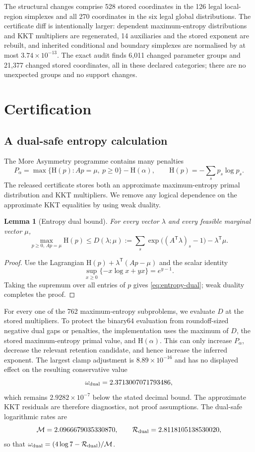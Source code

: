 \documentclass[11pt,reqno]{amsart}
\newtheorem{lemma}[theorem]{Lemma}
\theoremstyle{definition}
\theoremstyle{remark}
\newcommand{\Hent}{\mathrm{H}}
\begin{document}
The structural changes comprise 528 stored coordinates in the 126 legal local-region simplexes and all
270 coordinates in the six legal global distributions.  The certificate diff is intentionally larger:
dependent maximum-entropy distributions and KKT multipliers are regenerated, 14 auxiliaries and the
stored exponent are rebuilt, and inherited conditional and boundary simplexes are normalised by at most
$3.74\times10^{-13}$.  The exact audit finds 6,011 changed parameter groups and 21,377 changed stored
coordinates, all in these declared categories; there are no unexpected groups and no support changes.

\section{Certification}

\subsection{A dual-safe entropy calculation}

The More Asymmetry programme contains many penalties
\[
  P_\alpha=\max\{\Hent(p):Ap=\mu,\ p\ge0\}-\Hent(\alpha),
  \qquad
  \Hent(p)=-\sum_s p_s\log p_s.
\]
The released certificate stores both an approximate maximum-entropy primal distribution and KKT
multipliers.  We remove any logical dependence on the approximate KKT equalities by using weak duality.

\begin{lemma}[Entropy dual bound]\label{lem:entropy-dual}
For every vector $\lambda$ and every feasible marginal vector $\mu$,
\begin{equation}\label{eq:entropy-dual}
 \max_{p\ge0,\,Ap=\mu}\Hent(p)
 \le D(\lambda;\mu)
 :=\sum_s \exp\bigl((A^\mathsf{T}\lambda)_s-1\bigr)-\lambda^\mathsf{T}\mu.
\end{equation}
\end{lemma}

\begin{proof}
Use the Lagrangian
$\Hent(p)+\lambda^\mathsf{T}(Ap-\mu)$ and the scalar identity
\[
  \sup_{x\ge0}\{-x\log x+yx\}=e^{y-1}.
\]
Taking the supremum over all entries of $p$ gives \cref{eq:entropy-dual}; weak duality completes the
proof.
\end{proof}

For every one of the 762 maximum-entropy subproblems, we evaluate $D$ at the stored multipliers.  To
protect the binary64 evaluation from roundoff-sized negative dual gaps or penalties, the implementation
uses the maximum of $D$, the stored maximum-entropy primal value, and $\Hent(\alpha)$.  This can only
increase $P_\alpha$, decrease the relevant retention candidate, and hence increase the inferred exponent.
The largest clamp adjustment is $8.89\times10^{-16}$ and has no displayed effect on the resulting
conservative value
\[
  \omega_{\rm dual}=2.3713007071793486,
\]
which remains $2.9282\times10^{-7}$ below the stated decimal bound.  The approximate KKT residuals are
therefore diagnostics, not proof assumptions.  The dual-safe logarithmic rates are
\[
  \mathcal M=2.0966679035330870,
  \qquad
  \mathcal R_{\rm dual}=2.8118105138530020,
\]
so that $\omega_{\rm dual}=(4\log 7-\mathcal R_{\rm dual})/\mathcal M$.
\end{document}
